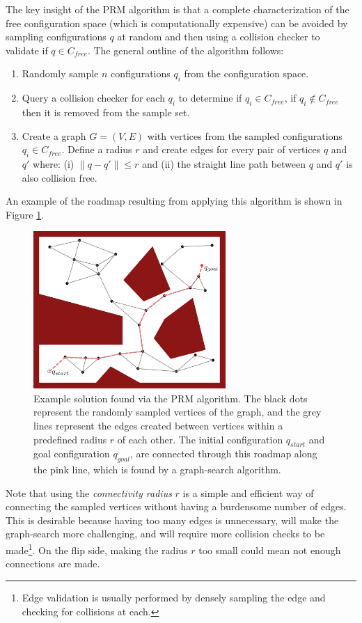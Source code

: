 The key insight of the PRM algorithm is that a complete characterization of the free configuration space (which is computationally expensive) can be avoided by sampling configurations $q$ at random and then using a collision checker to validate if $q \in C_{free}$. The general outline of the algorithm follows:
\begin{enumerate}
    \item Randomly sample $n$ configurations $q_i$ from the configuration space.
    \item Query a collision checker for each $q_i$ to determine if $q_i \in C_{free}$, if $q_i \not\in C_{free}$ then it is removed from the sample set.
    \item Create a graph $G = (V,E)$ with vertices from the sampled configurations $q_i \in C_{free}$. Define a radius $r$ and create edges for every pair of vertices $q$ and $q'$ where: (i) $\lVert q - q' \rVert \leq r$ and (ii) the straight line path between $q$ and $q'$ is also collision free.
\end{enumerate}
An example of the roadmap resulting from applying this algorithm is shown in Figure \ref{fig:prm-graph}.
\begin{figure}[ht]
  \centering
   \includegraphics[width=0.65\textwidth]{tex/figs/ch07_figs/prm.png}
  \caption{Example solution found via the PRM algorithm. The black dots represent the randomly sampled vertices of the graph, and the grey lines represent the edges created between vertices within a predefined radius $r$ of each other. The initial configuration $q_{start}$ and goal configuration $q_{goal}$, are connected through this roadmap along the pink line, which is found by a graph-search algorithm.}
  \label{fig:prm-graph}
\end{figure}
Note that using the \textit{connectivity radius} $r$ is a simple and efficient way of connecting the sampled vertices without having a burdensome number of edges. This is desirable because having too many edges is unnecessary, will make the graph-search more challenging, and will require more collision checks to be made\footnote{Edge validation is usually performed by densely sampling the edge and checking for collisions at each.}. On the flip side, making the radius $r$ too small could mean not enough connections are made.

